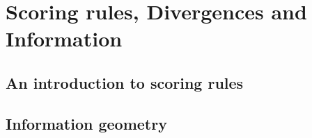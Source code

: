 \part{Scoring rules, Divergences and Information\label{part:1}}

\chapter{An introduction to scoring rules\label{sec:scoring_rules}}


\chapter{Information geometry\label{sec:information_geometry}}


% 